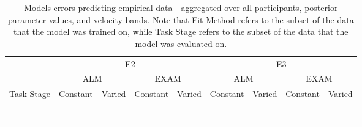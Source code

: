 \documentclass[
  11pt,
  letterpaper,
]{article}
\begin{document}
\begingroup
\fontsize{9.0pt}{10.8pt}\selectfont

\begin{longtable}{lrrrrrrrr}

\caption{\label{tbl-htw-modelError-e23}Models errors predicting
empirical data - aggregated over all participants, posterior parameter
values, and velocity bands. Note that Fit Method refers to the subset of
the data that the model was trained on, while Task Stage refers to the
subset of the data that the model was evaluated on.}

\tabularnewline

\toprule
 & \multicolumn{4}{c}{E2} & \multicolumn{4}{c}{E3} \\ 
\cmidrule(lr){2-5} \cmidrule(lr){6-9}
 & \multicolumn{2}{c}{ALM} & \multicolumn{2}{c}{EXAM} & \multicolumn{2}{c}{ALM} & \multicolumn{2}{c}{EXAM} \\ 
\cmidrule(lr){2-3} \cmidrule(lr){4-5} \cmidrule(lr){6-7} \cmidrule(lr){8-9}
Task Stage & Constant & Varied & Constant & Varied & Constant & Varied & Constant & Varied \\ 
\midrule\addlinespace[2.5pt]
\multicolumn{9}{l}{Fit to Test Data} \\[2.5pt] 
\midrule\addlinespace[2.5pt]
{\cellcolor[HTML]{FFFFFF}{Test}} & {\cellcolor[HTML]{FFFFFF}{239.7}} & {\cellcolor[HTML]{FFFFFF}{129.8}} & {\cellcolor[HTML]{FFFFFF}{99.7}} & {\cellcolor[HTML]{FFFFFF}{88.2}} & {\cellcolor[HTML]{FFFFFF}{170.1}} & {\cellcolor[HTML]{FFFFFF}{106.1}} & {\cellcolor[HTML]{FFFFFF}{92.3}} & {\cellcolor[HTML]{FFFFFF}{72.8}} \\ 
{\cellcolor[HTML]{FFFFFF}{Train}} & {\cellcolor[HTML]{FFFFFF}{53.1}} & {\cellcolor[HTML]{FFFFFF}{527.1}} & {\cellcolor[HTML]{FFFFFF}{108.1}} & {\cellcolor[HTML]{FFFFFF}{169.3}} & {\cellcolor[HTML]{FFFFFF}{70.9}} & {\cellcolor[HTML]{FFFFFF}{543.5}} & {\cellcolor[HTML]{FFFFFF}{157.8}} & {\cellcolor[HTML]{FFFFFF}{212.7}} \\ 
\midrule\addlinespace[2.5pt]
\multicolumn{9}{l}{Fit to Test \& Training Data} \\[2.5pt] 
\midrule\addlinespace[2.5pt]
{\cellcolor[HTML]{FFFFFF}{Test}} & {\cellcolor[HTML]{FFFFFF}{266.0}} & {\cellcolor[HTML]{FFFFFF}{208.2}} & {\cellcolor[HTML]{FFFFFF}{125.1}} & {\cellcolor[HTML]{FFFFFF}{126.4}} & {\cellcolor[HTML]{FFFFFF}{197.7}} & {\cellcolor[HTML]{FFFFFF}{189.5}} & {\cellcolor[HTML]{FFFFFF}{130.0}} & {\cellcolor[HTML]{FFFFFF}{128.5}} \\ 
{\cellcolor[HTML]{FFFFFF}{Train}} & {\cellcolor[HTML]{FFFFFF}{40.0}} & {\cellcolor[HTML]{FFFFFF}{35.4}} & {\cellcolor[HTML]{FFFFFF}{30.4}} & {\cellcolor[HTML]{FFFFFF}{23.6}} & {\cellcolor[HTML]{FFFFFF}{49.1}} & {\cellcolor[HTML]{FFFFFF}{85.6}} & {\cellcolor[HTML]{FFFFFF}{49.2}} & {\cellcolor[HTML]{FFFFFF}{78.4}} \\ 

\end{longtable}
\end{document}
